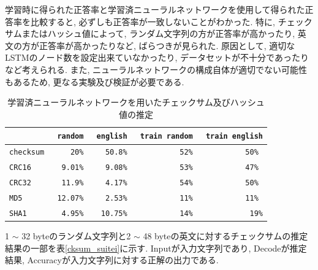 \documentclass[11pt]{jbook}
\begin{document}
学習時に得られた正答率と学習済ニューラルネットワークを使用して得られた正答率を比較すると, 必ずしも正答率が一致しないことがわかった.
特に, チェックサムまたはハッシュ値によって, ランダム文字列の方が正答率が高かったり, 英文の方が正答率が高かったりなど, ばらつきが見られた.
原因として, 適切なLSTMのノード数を設定出来ていなかったり, データセットが不十分であったりなど考えられる.
また, ニューラルネットワークの構成自体が適切でない可能性もあるため, 更なる実験及び検証が必要である.

\begin{table}[htp]
   \begin{center}
    \caption{学習済ニューラルネットワークを用いたチェックサム及びハッシュ値の推定}
    \smallskip
    \begin{tabular}{|l|r|r|r|r|}
    \hline
       &\texttt{random  }&\texttt{english  }&\texttt{train random }&\texttt{train english} \\ \hline
    \texttt{checksum   }&\texttt{20\% }&\texttt{50.8\%  }&\texttt{52\% }&\texttt{50\% }\\ \hline
    \texttt{CRC16     }&\texttt{9.01\% }&\texttt{9.08\% }&\texttt{53\% }&\texttt{47\%   } \\ \hline
    \texttt{CRC32    }&\texttt{11.9\% }&\texttt{4.17\%  }&\texttt{54\% }&\texttt{50\%  }  \\ \hline
    \texttt{MD5   }&\texttt{12.07\% }&\texttt{2.53\%  }&\texttt{11\% }&\texttt{11\%   } \\ \hline
    \texttt{SHA1    }&\texttt{4.95\% }&\texttt{10.75\%  }&\texttt{14\% }&\texttt{19\%}    \\ \hline
    \end{tabular}
    \label{seitouritu}
   \end{center}

\end{table}

\newpage

1 $\sim$ 32 byteのランダム文字列と2 $\sim$ 48 byteの英文に対するチェックサムの推定結果の一部を表\ref{cksum_suitei}に示す.
Inputが入力文字列であり, Decodeが推定結果, Accuracyが入力文字列に対する正解の出力である.\\
\end{document}
